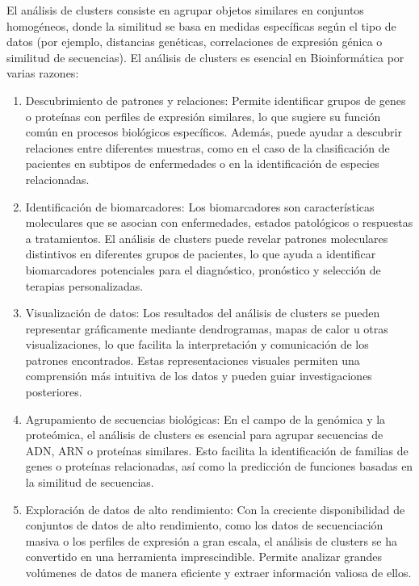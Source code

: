 \documentclass{article}
\begin{document}
El análisis de clusters  consiste en agrupar objetos similares en conjuntos homogéneos, donde la similitud se basa en medidas específicas según el tipo de datos (por ejemplo, distancias genéticas, correlaciones de expresión génica o similitud de secuencias). El análisis de clusters es esencial en Bioinformática por varias razones:

\begin{enumerate}
\item Descubrimiento de patrones y relaciones: Permite identificar grupos de genes o proteínas con perfiles de expresión similares, lo que sugiere su función común en procesos biológicos específicos. Además, puede ayudar a descubrir relaciones entre diferentes muestras, como en el caso de la clasificación de pacientes en subtipos de enfermedades o en la identificación de especies relacionadas.
\item Identificación de biomarcadores: Los biomarcadores son características moleculares que se asocian con enfermedades, estados patológicos o respuestas a tratamientos. El análisis de clusters puede revelar patrones moleculares distintivos en diferentes grupos de pacientes, lo que ayuda a identificar biomarcadores potenciales para el diagnóstico, pronóstico y selección de terapias personalizadas.

\item Visualización de datos: Los resultados del análisis de clusters se pueden representar gráficamente mediante dendrogramas, mapas de calor u otras visualizaciones, lo que facilita la interpretación y comunicación de los patrones encontrados. Estas representaciones visuales permiten una comprensión más intuitiva de los datos y pueden guiar investigaciones posteriores.

\item Agrupamiento de secuencias biológicas: En el campo de la genómica y la proteómica, el análisis de clusters es esencial para agrupar secuencias de ADN, ARN o proteínas similares. Esto facilita la identificación de familias de genes o proteínas relacionadas, así como la predicción de funciones basadas en la similitud de secuencias.

\item Exploración de datos de alto rendimiento: Con la creciente disponibilidad de conjuntos de datos de alto rendimiento, como los datos de secuenciación masiva o los perfiles de expresión a gran escala, el análisis de clusters se ha convertido en una herramienta imprescindible. Permite analizar grandes volúmenes de datos de manera eficiente y extraer información valiosa de ellos.
\end{enumerate}
\end{document}
